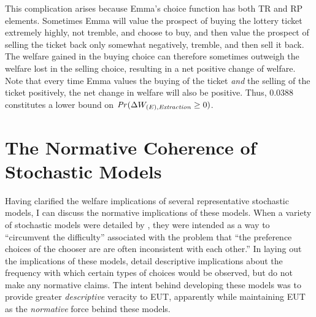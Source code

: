 \documentclass[../main.tex]{subfiles}
\begin{document}
This complication arises because Emma's choice function has both TR and RP elements.
Sometimes Emma will value the prospect of buying the lottery ticket extremely highly, not tremble, and choose to buy, and then value the prospect of selling the ticket back only somewhat negatively, tremble, and then sell it back.
The welfare gained in the buying choice can therefore sometimes outweigh the welfare lost in the selling choice, resulting in a net positive change of welfare.
Note that every time Emma values the buying of the ticket \textit{and} the selling of the ticket positively, the net change in welfare will also be positive.
Thus, $0.0388$ constitutes a lower bound on ${\mathit{Pr}}(\Delta W_{(E),\mathit{Extraction}} \geq 0)$.

\singlespacing
\section{The Normative Coherence of Stochastic Models}
\doublespacing



Having clarified the welfare implications of several representative stochastic models, I can discuss the normative implications of these models.
When a variety of stochastic models were detailed by \textcite{Becker1963}, they were intended as a way to \enquote{circumvent the difficulty} associated with the problem that \enquote{the preference choices of the chooser are are often inconsistent with each other.}
In laying out the implications of these models, \textcite{Becker1963} detail descriptive implications about the frequency with which certain types of choices would be observed, but do not make any normative claims.
The intent behind developing these models was to provide greater \textit{descriptive} veracity to EUT, apparently while maintaining EUT as the \textit{normative} force behind these models.
\end{document}
